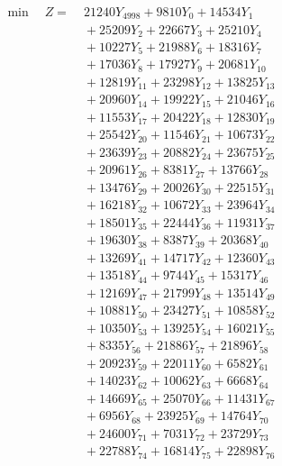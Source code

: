 \documentclass[a4paper,10pt]{article}
\begin{document}
\allowdisplaybreaks
{\small
\begin{align}
\min \quad Z = &\; 21240 Y_{4998} + 9810 Y_{0} + 14534 Y_{1} \\[0.3ex]
&\;  + 25209 Y_{2} + 22667 Y_{3} + 25210 Y_{4} \\[0.3ex]
&\;  + 10227 Y_{5} + 21988 Y_{6} + 18316 Y_{7} \\[0.3ex]
&\;  + 17036 Y_{8} + 17927 Y_{9} + 20681 Y_{10} \\[0.3ex]
&\;  + 12819 Y_{11} + 23298 Y_{12} + 13825 Y_{13} \\[0.3ex]
&\;  + 20960 Y_{14} + 19922 Y_{15} + 21046 Y_{16} \\[0.3ex]
&\;  + 11553 Y_{17} + 20422 Y_{18} + 12830 Y_{19} \\[0.3ex]
&\;  + 25542 Y_{20} + 11546 Y_{21} + 10673 Y_{22} \\[0.3ex]
&\;  + 23639 Y_{23} + 20882 Y_{24} + 23675 Y_{25} \\[0.3ex]
&\;  + 20961 Y_{26} + 8381 Y_{27} + 13766 Y_{28} \\[0.5ex]\allowbreak
&\;  + 13476 Y_{29} + 20026 Y_{30} + 22515 Y_{31} \\[0.3ex]
&\;  + 16218 Y_{32} + 10672 Y_{33} + 23964 Y_{34} \\[0.3ex]
&\;  + 18501 Y_{35} + 22444 Y_{36} + 11931 Y_{37} \\[0.3ex]
&\;  + 19630 Y_{38} + 8387 Y_{39} + 20368 Y_{40} \\[0.3ex]
&\;  + 13269 Y_{41} + 14717 Y_{42} + 12360 Y_{43} \\[0.3ex]
&\;  + 13518 Y_{44} + 9744 Y_{45} + 15317 Y_{46} \\[0.3ex]
&\;  + 12169 Y_{47} + 21799 Y_{48} + 13514 Y_{49} \\[0.3ex]
&\;  + 10881 Y_{50} + 23427 Y_{51} + 10858 Y_{52} \\[0.3ex]
&\;  + 10350 Y_{53} + 13925 Y_{54} + 16021 Y_{55} \\[0.3ex]
&\;  + 8335 Y_{56} + 21886 Y_{57} + 21896 Y_{58} \\[0.5ex]\allowbreak
&\;  + 20923 Y_{59} + 22011 Y_{60} + 6582 Y_{61} \\[0.3ex]
&\;  + 14023 Y_{62} + 10062 Y_{63} + 6668 Y_{64} \\[0.3ex]
&\;  + 14669 Y_{65} + 25070 Y_{66} + 11431 Y_{67} \\[0.3ex]
&\;  + 6956 Y_{68} + 23925 Y_{69} + 14764 Y_{70} \\[0.3ex]
&\;  + 24600 Y_{71} + 7031 Y_{72} + 23729 Y_{73} \\[0.3ex]
&\;  + 22788 Y_{74} + 16814 Y_{75} + 22898 Y_{76} \\[0.3ex]

\end{align}}
\end{document}
